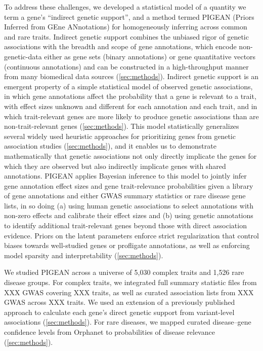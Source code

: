 To address these challenges, we developed a statistical model of a quantity we term a gene's ``indirect genetic support'', and a method termed PIGEAN (Priors Inferred from GEne ANnotations) for homogeneously inferring across common and rare traits. Indirect genetic support combines the unbiased rigor of genetic associations with the breadth and scope of gene annotations, which encode non-genetic-data either as gene sets (binary annotations) or gene quantitative vectors (continuous annotations) and can be constructed in a high-throughput manner from many biomedical data sources (\ref{sec:methods}). Indirect genetic support is an emergent property of a simple statistical model of observed genetic associations, in which gene annotations affect the probability that a gene is relevant to a trait, with effect sizes unknown and different for each annotation and each trait, and in which trait-relevant genes are more likely to produce genetic associations than are non-trait-relevant genes (\ref{sec:methods}).  This model statistically generalizes several widely used heuristic approaches for prioritizing genes from genetic association studies (\ref{sec:methods}), and it enables us to demonstrate mathematically that genetic associations not only directly implicate the genes for which they are observed but also indirectly implicate genes with shared annotations. PIGEAN applies Bayesian inference to this model to jointly infer gene annotation effect sizes and gene trait-relevance probabilities given a library of gene annotations and either GWAS summary statistics or rare disease gene lists, in so doing (a) using human genetic associations to select annotations with non-zero effects and calibrate their effect sizes and (b) using genetic annotations to identify additional trait-relevant genes beyond those with direct association evidence. Priors on the latent parameters enforce strict regularization that control biases towards well-studied genes or profligate annotations, as well as enforcing model sparsity and interpretability (\ref{sec:methods}).

We studied PIGEAN across a universe of 5,030 complex traits and 1,526 rare disease groups. For complex traits, we integrated full summary statistic files from XXX GWAS covering XXX traits, as well as curated association lists from XXX GWAS across XXX traits. We used an extension of a previously published approach \cite{dornbos_evaluating_2022} to calculate each gene's direct genetic support from variant-level associations (\ref{sec:methods}).  For rare diseases, we mapped curated disease–gene confidence levels from Orphanet to probabilities of disease relevance (\ref{sec:methods}).  

